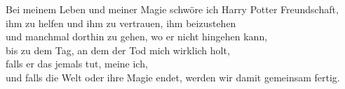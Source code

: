 \begin{center}
\begin{em}
\noindent{}Bei meinem Leben und meiner Magie schwöre ich Harry Potter Freundschaft,\\
ihm zu helfen und ihm zu vertrauen, ihm beizustehen \\
und manchmal dorthin zu gehen, wo er nicht hingehen kann,\\
bis zu dem Tag, an dem der Tod mich wirklich holt, \\
falls er das jemals tut, meine ich,\\
und falls die Welt oder ihre Magie endet, werden wir damit gemeinsam fertig.
\end{em}
\end{center}

\newpage

